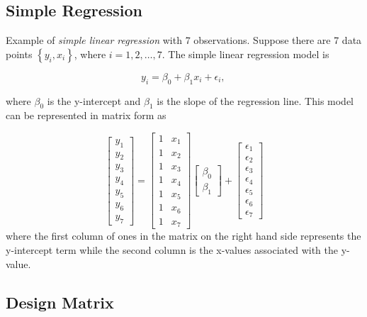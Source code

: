 \subsection{Simple Regression}
Example of \emph{simple linear regression} with 7 observations.
Suppose there are 7 data points $\left\{ {{y_i},{x_i}} \right\}$, where $i=1,2,…,7$. The simple linear regression model is

\begin{equation}
  y_i = \beta_0 + \beta_1 x_i +\epsilon_i, \,
\end{equation}

where $\beta_0$ is the y-intercept and $\beta_1$ is the slope of the regression line. This model can be represented in matrix form as

\begin{equation}\label{eq:simpleRegression}
  \begin{bmatrix}y_1 \\ y_2 \\ y_3 \\ y_4 \\ y_5 \\ y_6 \\ y_7 \end{bmatrix}
  =
  \begin{bmatrix}1 & x_1  \\1 & x_2  \\1 & x_3  \\1 & x_4  \\1 & x_5  \\1 & x_6 \\ 1 & x_7  \end{bmatrix}
  \begin{bmatrix} \beta_0 \\ \beta_1  \end{bmatrix}
  +
  \begin{bmatrix} \epsilon_1 \\ \epsilon_2 \\ \epsilon_3 \\ \epsilon_4 \\ \epsilon_5 \\ \epsilon_6 \\ \epsilon_7 \end{bmatrix}
\end{equation}
where the first column of ones in the matrix on the right hand side represents the y-intercept term while the second column is the x-values associated with the y-value.

\subsection{Design Matrix}

